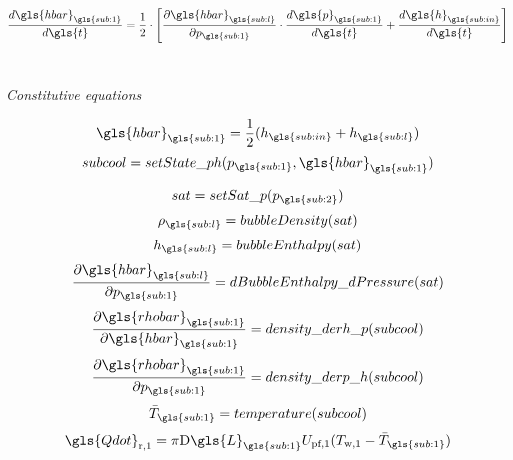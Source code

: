 \begin{equation}
\frac{d \gls{hbar}_{\gls{sub:1}}}{d \gls{t}} = \frac{1}{2} \cdot \left[\frac{\partial \gls{hbar}_{\gls{sub:l}}}{\partial p_{\gls{sub:1}}} \cdot \frac{d \gls{p}_{\gls{sub:1}}}{d \gls{t}} + \frac{d \gls{h}_{\gls{sub:in}}}{d \gls{t}}\right]
\end{equation}
\\
\begin{center}
\textit{Constitutive equations}\\
\end{center}

\begin{equation}
\gls{hbar}_{\gls{sub:1}} =  \frac{1}{2}(h_{\gls{sub:in}} + {h}_{\gls{sub:l}})
\end{equation}
\begin{equation}
subcool = setState\_ph(p_{\gls{sub:1}},\gls{hbar}_{\gls{sub:1}})
\end{equation}

\begin{equation}
sat = setSat\_p(p_{\gls{sub:2}})
\end{equation}
\begin{equation}
\rho_{\gls{sub:l}} = bubbleDensity(sat)
\end{equation}
\begin{equation}
h_{\gls{sub:l}} = bubbleEnthalpy(sat)
\end{equation}
\begin{equation}
\frac{\partial \gls{hbar}_{\gls{sub:l}}}{\partial p_{\gls{sub:1}}}= dBubbleEnthalpy\_dPressure(sat)
\end{equation}
\begin{equation}
\frac{\partial \gls{rhobar}_{\gls{sub:1}}}{\partial \gls{hbar}_{\gls{sub:1}}}= density\_derh\_p(subcool)
\end{equation}
\begin{equation}
\frac{\partial \gls{rhobar}_{\gls{sub:1}}}{\partial p_{\gls{sub:1}}}= density\_derp\_h(subcool)
\end{equation}
\begin{equation}
\bar{T}_{\gls{sub:1}} = temperature(subcool)
\end{equation}
\begin{equation}
\gls{Qdot}_\text{r,1} = \pi \text{D} \gls{L}_{\gls{sub:1}} U_\text{pf,1} (T_\text{w,1} - \bar{T}_{\gls{sub:1}})
\end{equation}



